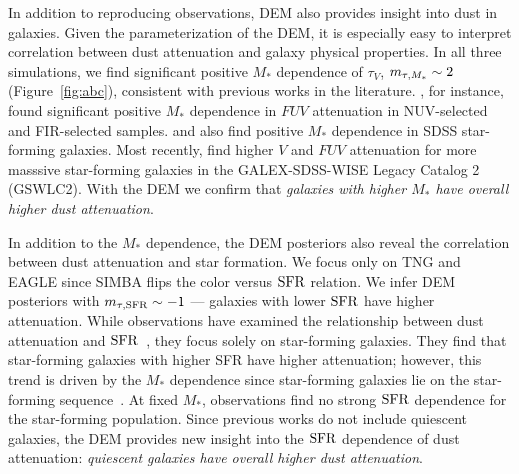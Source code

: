 In addition to reproducing observations, DEM also provides insight into dust in
galaxies. Given the parameterization of the DEM, it is especially easy to
interpret correlation between dust attenuation and galaxy physical properties.
In all three simulations, we find significant positive $M_*$ dependence of
$\tau_V$, $m_{\tau,M_*} \sim 2$ (Figure~\ref{fig:abc}), consistent with previous
works in the literature. \cite{burgarella2005}, for instance, found significant
positive $M_*$ dependence in $FUV$ attenuation in NUV-selected and FIR-selected
samples. \cite{garn2010} and \cite{battisti2016} also find positive $M_*$ 
dependence in SDSS star-forming galaxies. Most recently, \cite{salim2018} 
find higher $V$ and $FUV$ attenuation for more masssive star-forming galaxies in the
GALEX-SDSS-WISE Legacy Catalog 2 (GSWLC2). With the DEM we confirm that
\emph{galaxies with higher $M_*$ have overall higher dust attenuation}.

In addition to the $M_*$ dependence, the DEM posteriors also reveal the
correlation between dust attenuation and star formation. We focus only on TNG
and EAGLE since SIMBA flips the color versus ${\rm SFR}$ relation. We infer DEM
posteriors with $m_{\tau,{\rm SFR}}\sim-1$ --- galaxies with lower ${\rm SFR}$ have higher
attenuation. While observations have examined the relationship between dust
attenuation and ${\rm SFR}$~\citep[\eg][]{garn2010, reddy2015, battisti2016,
battisti2017}, they focus solely on star-forming galaxies. They find that
star-forming galaxies with higher SFR have higher attenuation; however, this
trend is driven by the $M_*$ dependence since star-forming galaxies lie on 
the star-forming sequence~\citep{garn2010, battisti2017}. At fixed $M_*$,
observations find no strong ${\rm SFR}$ dependence for the star-forming population. 
Since previous works do not include quiescent galaxies, the DEM provides new
insight into the ${\rm SFR}$ dependence of dust attenuation: \emph{quiescent
galaxies have overall higher dust attenuation}. 


